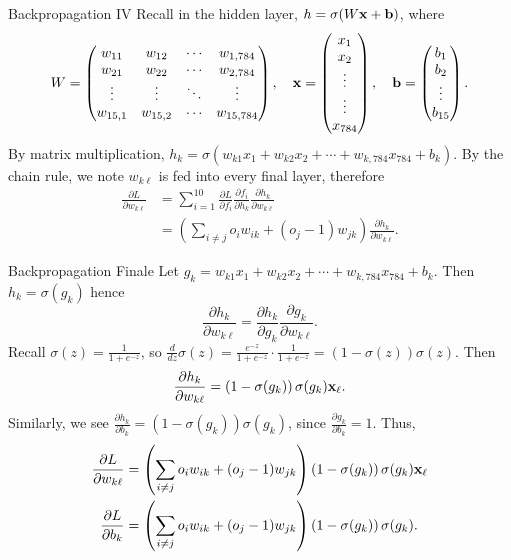 \documentclass[xcolor=dvipsnames, fontsize=11pt, %
pagesize, %
parskip=half-, t]{beamer}
\begin{document}
\begin{frame}{Backpropagation IV}
Recall in the hidden layer, $h=\sigma(W\bold{x}+\bold{b})$, where  $$W=\begin{pmatrix} w_{11} & w_{12}  & \cdots &  w_{1,784} \\  w_{21} & w_{22} & \cdots & w_{2,784} \\  \vdots & \vdots  & \ddots & \vdots \\  w_{15, 1} & w_{15, 2}  & \cdots & w_{15, 784} \end{pmatrix}, \quad \bold{x}=\begin{pmatrix} x_1 \\ x_2 \\ \vdots  \\ \vdots \\ x_{784} \end{pmatrix}, \quad \bold{b}=\begin{pmatrix} b_1 \\ b_2 \\ \vdots \\ b_{15} \end{pmatrix}.$$ \pause
By matrix multiplication, $h_k=\sigma(w_{k1}x_1+w_{k2}x_2+\cdots+w_{k,784}x_{784}+b_k)$. \pause By the chain rule, we note $w_{k\ell}$ is fed into every final layer, therefore \begin{align*} \frac{\partial L}{\partial w_{k\ell}}&=\sum_{i=1}^{10}\frac{\partial L}{\partial f_i}\frac{\partial f_i}{\partial h_k}\frac{\partial h_k}{\partial w_{k\ell}} \\ &= \left(\sum_{i\neq j}o_iw_{ik}+(o_j-1)w_{jk}\right)\frac{\partial h_k}{\partial w_{k\ell}}.\end{align*}
\end{frame}
\begin{frame}{Backpropagation Finale}
Let $g_k=w_{k1}x_1+w_{k2}x_2+\cdots+w_{k,784}x_{784}+b_k$. Then $h_k=\sigma(g_k)$ hence $$\frac{\partial h_k}{\partial w_{k\ell}}=\frac{\partial h_k}{\partial g_k}\frac{\partial g_k}{\partial w_{k\ell}}.$$ \pause
Recall $\sigma(z)=\frac{1}{1+e^{-z}}$, so $\frac{d}{dz}\sigma(z)=\frac{e^{-z}}{1+e^{-z}}\cdot \frac{1}{1+e^{-z}}=\left(1-\sigma(z)\right)\sigma(z).$ \pause Then $$\frac{\partial h_k}{\partial w_{k\ell}}=\left(1-\sigma(g_k)\right)\sigma(g_k)\bold{x}_{\ell}.$$ \pause Similarly, we see $\frac{\partial h_k}{\partial b_k}=\left(1-\sigma(g_k)\right)\sigma(g_k)$, since $\frac{\partial g_k}{\partial b_k}=1$. \pause Thus, \begin{align*} \frac{\partial L}{\partial w_{k\ell}}&=\left(\sum_{i\neq j}o_iw_{ik}+(o_j-1)w_{jk}\right)\left(1-\sigma(g_k)\right)\sigma(g_k)\bold{x}_{\ell} \\ \frac{\partial L}{\partial b_k}&=\left(\sum_{i\neq j}o_iw_{ik}+(o_j-1)w_{jk}\right)\left(1-\sigma(g_k)\right)\sigma(g_k). \end{align*}
\end{frame}
\end{document}
